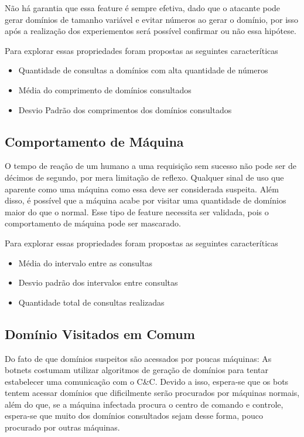 Não há garantia que essa feature é sempre efetiva, dado que o atacante pode gerar domínios de tamanho variável e evitar números ao gerar o domínio, por isso após a realização dos experiementos será possível confirmar ou não essa hipótese.

Para explorar essas propriedades foram propostas as seguintes caracteríticas

\begin{itemize}
\item Quantidade de consultas a domínios com alta quantidade de números
\item Média do comprimento de domínios consultados
\item Desvio Padrão dos comprimentos dos domínios consultados
\end{itemize}

\subsection{Comportamento de Máquina}

O tempo de reação de um humano a uma requisição sem sucesso não pode ser de décimos de segundo, por mera limitação de reflexo. Qualquer sinal de uso que aparente como uma máquina como essa deve ser considerada suspeita. Além disso, é possível que a máquina acabe por visitar uma quantidade de domínios maior do que o normal. Esse tipo de feature necessita ser validada, pois o comportamento de máquina pode ser mascarado.

Para explorar essas propriedades foram propostas as seguintes caracteríticas

\begin{itemize}
\item Média do intervalo entre as consultas
\item Desvio padrão dos intervalos entre consultas
\item Quantidade total de consultas realizadas
\end{itemize}

\subsection{Domínio Visitados em Comum}
Do fato de que domínios suspeitos são acessados por poucas máquinas: As botnets costumam utilizar algoritmos de geração de domínios para tentar estabelecer uma comunicação com o C\&C. Devido a isso, espera-se que os bots tentem acessar domínios que dificilmente serão procurados por máquinas normais, além do que, se a máquina infectada procura o centro de comando e controle, espera-se que muito dos domínios consultados sejam desse forma, pouco procurado por outras máquinas.

